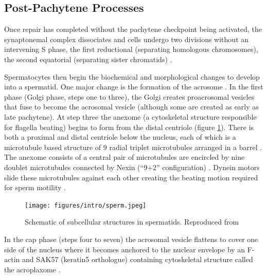 \subsection{Post-Pachytene Processes}
Once repair has completed without the pachytene checkpoint being activated, the synaptonemal complex dissociates and cells undergo two divisions without an intervening S phase, the first reductional (separating homologous chromosomes), the second equatorial (separating sister chromatids) \parencite{Roeder2000pachytene, Subramanian2014Meiotic, Watanabe2012Geometry}.

Spermatocytes then begin the biochemical and morphological changes to develop into a spermatid. One major change is the formation of the acrosome \parencite[reviewed in][]{Buffone2016Sperm, Khawar2019Mechanism}. In the first phase (Golgi phase, steps one to three), the Golgi creates proacrosomal vesicles that fuse to become the acrosomal vesicle (although some are created as early as late pachytene). At step three the anexome (a cytoskeletal structure responsible for flagella beating) begins to form from the distal centriole (figure \ref{fig:Spermatids}). There is both a proximal and distal centriole below the nucleus, each of which is a microtubule based structure of 9 radial triplet microtubules arranged in a barrel \parencite{Fawcett1969fine, Avidor-Reiss2019It}. The anexome consists of a central pair of microtubules are encircled by nine doublet microtubules connected by Nexin (``9+2'' configuration) \parencite{Linck2016axoneme, Lehti2017Formation}. Dynein motors slide these microtubules against each other creating the beating motion required for sperm motility \parencite{Mitchison2010How}.


\begin{figure}[H]
	\centering
	\texttt{[image: figures/intro/sperm.jpeg]}
	\caption[Spermatids]{Schematic of subcellular structures in spermatids. Reproduced from \parencite{Dunleavy2019cytoskeleton}}
	\label{fig:Spermatids}
\end{figure}


In the cap phase (steps four to seven) the acrosomal vesicle flattens to cover one side of the nucleus where it becomes anchored to the nuclear envelope by an F-actin and SAK57 (keratin5 orthologue) containing cytoskeletal structure called the acroplaxome \parencite{Kierszenbaum2003Acroplaxome, Kierszenbaum2004acrosomeacroplaxomemanchette}.


